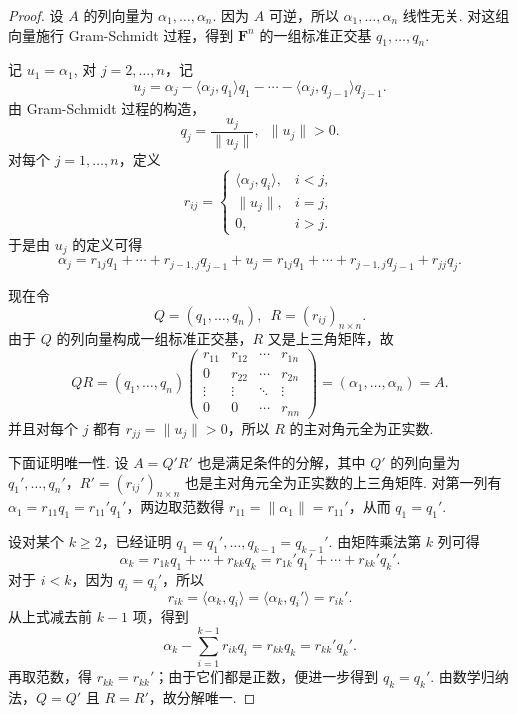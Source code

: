 \begin{proof}
    设 $A$ 的列向量为 $\alpha_1, \ldots, \alpha_n$. 因为 $A$ 可逆，所以 $\alpha_1, \ldots, \alpha_n$ 线性无关. 对这组向量施行 Gram-Schmidt 过程，得到 $\mathbf{F}^n$ 的一组标准正交基 $q_1, \ldots, q_n$.

    记 $u_1 = \alpha_1$, 对 $j = 2, \ldots, n$，记
    \[
        u_j = \alpha_j - \langle \alpha_j, q_1 \rangle q_1 - \cdots - \langle \alpha_j, q_{j-1} \rangle q_{j-1}.
    \]
    由 Gram-Schmidt 过程的构造，
    \[
        q_j = \frac{u_j}{\lVert u_j \rVert}, \enspace \lVert u_j \rVert > 0.
    \]
    对每个 $j = 1, \ldots, n$，定义
    \[
        r_{ij} =
        \begin{cases}
            \langle \alpha_j, q_i \rangle, & i < j, \\
            \lVert u_j \rVert,             & i = j, \\
            0,                             & i > j.
        \end{cases}
    \]
    于是由 $u_j$ 的定义可得
    \[
        \alpha_j = r_{1j} q_1 + \cdots + r_{j-1,j} q_{j-1} + u_j
        = r_{1j} q_1 + \cdots + r_{j-1,j} q_{j-1} + r_{jj} q_j.
    \]

    现在令
    \[
        Q = (q_1, \ldots, q_n), \enspace R = (r_{ij})_{n \times n}.
    \]
    由于 $Q$ 的列向量构成一组标准正交基，$R$ 又是上三角矩阵，故
    \[
        QR = (q_1, \ldots, q_n)
        \begin{pmatrix}
            r_{11} & r_{12} & \cdots & r_{1n} \\
            0      & r_{22} & \cdots & r_{2n} \\
            \vdots & \vdots & \ddots & \vdots \\
            0      & 0      & \cdots & r_{nn}
        \end{pmatrix}
        = (\alpha_1, \ldots, \alpha_n) = A.
    \]
    并且对每个 $j$ 都有 $r_{jj} = \lVert u_j \rVert > 0$，所以 $R$ 的主对角元全为正实数.

    下面证明唯一性. 设 $A = Q'R'$ 也是满足条件的分解，其中 $Q'$ 的列向量为 $q_1', \ldots, q_n'$，$R' = (r_{ij}')_{n \times n}$ 也是主对角元全为正实数的上三角矩阵. 对第一列有 $\alpha_1 = r_{11} q_1 = r_{11}' q_1'$，两边取范数得 $r_{11} = \lVert \alpha_1 \rVert = r_{11}'$，从而 $q_1 = q_1'$.

    设对某个 $k \geqslant 2$，已经证明 $q_1 = q_1', \ldots, q_{k-1} = q_{k-1}'$. 由矩阵乘法第 $k$ 列可得
    \[
        \alpha_k = r_{1k} q_1 + \cdots + r_{kk} q_k = r_{1k}' q_1' + \cdots + r_{kk}' q_k'.
    \]
    对于 $i < k$，因为 $q_i = q_i'$，所以
    \[
        r_{ik} = \langle \alpha_k, q_i \rangle = \langle \alpha_k, q_i' \rangle = r_{ik}'.
    \]
    从上式减去前 $k-1$ 项，得到
    \[
        \alpha_k - \sum_{i=1}^{k-1} r_{ik} q_i = r_{kk} q_k = r_{kk}' q_k'.
    \]
    再取范数，得 $r_{kk} = r_{kk}'$；由于它们都是正数，便进一步得到 $q_k = q_k'$. 由数学归纳法，$Q = Q'$ 且 $R = R'$，故分解唯一.
\end{proof}


